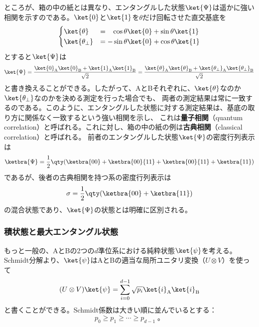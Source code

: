 \documentclass[a4paper,11pt,uplatex]{jsarticle}%
\begin{document}
ところが、箱の中の紙とは異なり、エンタングルした状態$\ket{\Psi}$は遥かに強い相関を示すのである。$\ket{0}$と$\ket{1}$を$\theta$だけ回転させた直交基底を
\begin{equation}
  \begin{cases}
    \ket{\theta}         & = \;\;\;\cos\theta\ket{0} + \sin\theta\ket{1} \\
    \ket{\theta_{\perp}} & = -\sin\theta\ket{0} + \cos\theta\ket{1}
  \end{cases}
\end{equation}
とすると$\ket{\Psi}$は
\begin{equation}
  \ket{\Psi} = \frac{\ket{0}_{\text{A}}\ket{0}_{\text{B}} + \ket{1}_{\text{A}}\ket{1}_{\text{B}}}{\sqrt{2}} 
             = \frac{\ket{\theta}_{\text{A}}\ket{\theta}_{\text{B}} + \ket{\theta_{\perp}}_{\text{A}}\ket{\theta_{\perp}}_{\text{B}}}{\sqrt{2}}
\end{equation}
と書き換えることができる。したがって、AとBそれぞれに、$\ket{\theta}$なのか$\ket{\theta_{\perp}}$なのかを決める測定を行った場合でも、
両者の測定結果は常に一致するのである。このように、エンタングルした状態に対する測定結果は、基底の取り方に関係なく一致するという強い相関を示し、
これは\textbf{量子相関}（quantum correlation）と呼ばれる。これに対し、箱の中の紙の例は\textbf{古典相関}（classical correlation）と呼ばれる。
前者のエンタングルした状態$\ket{\Psi}$の密度行列表示は
\begin{equation}
  \ketbra{\Psi} = \frac{1}{2}\qty(\ketbra{00} + \ketbra{00}{11} + \ketbra{00}{11} + \ketbra{11})
\end{equation}
であるが、後者の古典相関を持つ系の密度行列表示は
\begin{equation}
  \sigma = \frac{1}{2}\qty(\ketbra{00} + \ketbra{11})
\end{equation}
の混合状態であり、$\ket{\Psi}$の状態とは明確に区別される。

\subsubsection{積状態と最大エンタングル状態}

もっと一般の、AとBの2つの$d$準位系における純粋状態$\ket{\psi}$を考える。
Schmidt分解より、$\ket{\psi}$はAとBの適当な局所ユニタリ変換（$U\otimes V$）を使って
\begin{equation}
  (U\otimes V)\ket{\psi} = \sum_{i=0}^{d-1}\sqrt{p_i}\ket{i}_{\text{A}}\ket{i}_{\text{B}}
\end{equation}
と書くことができる。Schmidt係数は大きい順に並んでいるとする：
\begin{equation}
  p_0 \geq p_1 \geq \cdots \geq p_{d-1}\;。 
\end{equation}
\end{document}

